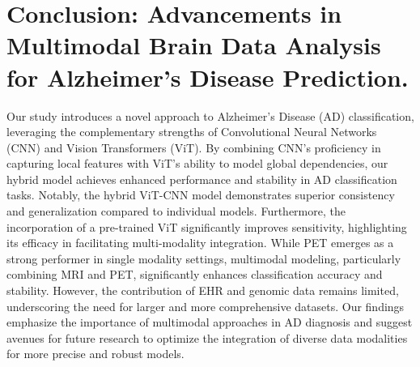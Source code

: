 \section{Conclusion: Advancements in Multimodal Brain Data Analysis for Alzheimer’s Disease Prediction.}
Our study introduces a novel approach to Alzheimer’s Disease (AD) classification, leveraging the complementary strengths of Convolutional Neural Networks (CNN) and Vision Transformers (ViT). By combining CNN's proficiency in capturing local features with ViT's ability to model global dependencies, our hybrid model achieves enhanced performance and stability in AD classification tasks. Notably, the hybrid ViT-CNN model demonstrates superior consistency and generalization compared to individual models. Furthermore, the incorporation of a pre-trained ViT significantly improves sensitivity, highlighting its efficacy in facilitating multi-modality integration. While PET emerges as a strong performer in single modality settings, multimodal modeling, particularly combining MRI and PET, significantly enhances classification accuracy and stability. However, the contribution of EHR and genomic data remains limited, underscoring the need for larger and more comprehensive datasets. Our findings emphasize the importance of multimodal approaches in AD diagnosis and suggest avenues for future research to optimize the integration of diverse data modalities for more precise and robust models. 